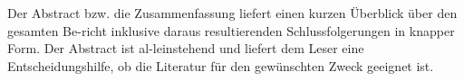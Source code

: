 Der Abstract bzw. die Zusammenfassung liefert einen kurzen Überblick über den gesamten Be-richt inklusive daraus resultierenden Schlussfolgerungen in knapper Form. Der Abstract ist al-leinstehend und liefert dem Leser eine Entscheidungshilfe, ob die Literatur für den gewünschten Zweck geeignet ist.